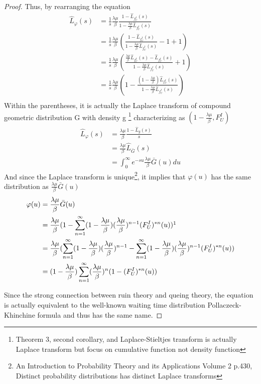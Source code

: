 \documentclass[project2.tex]{subfiles}
\begin{document}
\begin{proof}
Thus, by rearranging the equation
\begin{align*}
\hat{L}_{\varphi}(s)&=\frac{1}{s}\frac{\lambda\mu}{\beta}\frac{1-\hat{L}_{f_U^I}(s)}{1-\frac{\lambda\mu}{\beta}\hat{L}_{f_U^I}(s)}\\
&=\frac{1}{s}\frac{\lambda\mu}{\beta}(\frac{1-\hat{L}_{f_U^I}(s)}{1-\frac{\lambda\mu}{\beta}\hat{L}_{f_U^I}(s)}-1+1)\\
&=\frac{1}{s}\frac{\lambda\mu}{\beta}(\frac{\frac{\lambda\mu}{\beta}\hat{L}_{f_U^I}(s)-\hat{L}_{f_U^I}(s)}{1-\frac{\lambda\mu}{\beta}\hat{L}_{f_U^I}(s)}+1)\\
&=\frac{1}{s}\frac{\lambda\mu}{\beta}(1-\frac{(1-\frac{\lambda\mu}{\beta})\hat{L}_{f_U^I}(s)}{1-\frac{\lambda\mu}{\beta}\hat{L}_{f_U^I}(s)})\\
\end{align*}
Within the parentheses, it is actually the Laplace transform of compound geometric distribution G with density g \footnote{Theorem 3, second corollary, and Laplace-Stieltjes transform is actually Laplace transform but focus on cumulative function not density function} characterizing as $(1-\frac{\lambda\mu}{\beta},F_U^I)$
\begin{align*} 
\hat{L}_{\varphi}(s)&=\frac{\lambda\mu}{\beta}\frac{1-\hat{L}_{g}(s)}{s}\\
&=\frac{\lambda\mu}{\beta}\hat{L}_{\bar{G}}(s)\\
&=\int_0^\infty e^{-su}\frac{\lambda\mu}{\beta}\bar{G}(u)du
\end{align*}
And since the Laplace transform is unique\footnote{An Introduction to Probability Theory and its Applications Volume 2 p.430, Distinct probability distributions has distinct Laplace transforms}, it implies that $\varphi(u)$ has the same distribution as $\frac{\lambda\mu}{\beta}\bar{G}(u)$
\begin{align*}
\varphi(u)&=\frac{\lambda\mu}{\beta}\bar{G}(u)\\
&=\frac{\lambda\mu}{\beta}(1-\sum_{n=1}^{\infty}(1-\frac{\lambda\mu}{\beta})(\frac{\lambda\mu}{\beta})^{n-1}(F_U^I)^{*n}(u))\footnotemark\\
&=\frac{\lambda\mu}{\beta}(\sum_{n=1}^{\infty}(1-\frac{\lambda\mu}{\beta})(\frac{\lambda\mu}{\beta})^{n-1}-\sum_{n=1}^{\infty}(1-\frac{\lambda\mu}{\beta})(\frac{\lambda\mu}{\beta})^{n-1}(F_U^I)^{*n}(u))\\
&=(1-\frac{\lambda\mu}{\beta})\sum^{\infty}_{n=1}(\frac{\lambda\mu}{\beta})^n(1-(F_U^I)^{*n}(u))\\
\end{align*}
\addtocounter{footnote}{-1}
Since the strong connection between ruin theory and queing theory, the equation is actually equivalent to the well-known waiting time distribution Pollaczeck-Khinchine formula and thus has the same name.  
\end{proof}
\end{document}
